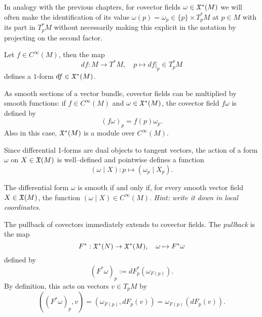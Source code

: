 In analogy with the previous chapters, for covector fields $\omega\in\mathfrak{X}^*(M)$ we will often make the identification of its value $\omega(p) = \omega_p \in \{p\}\times T^*_p M$ at $p\in M$ with its part in $T_p^*M$ without necessarily making this explicit in the notation by projecting on the second factor.

\begin{example}
  Let $f\in C^\infty(M)$, then the map
  \begin{equation}
    df : M \to T^*M, \quad p \mapsto df|_p \in T^*_p M
  \end{equation}
  defines a $1$-form $df\in\mathfrak{X}^*(M)$.
\end{example}

As smooth sections of a vector bundle, covector fields can be multiplied by smooth functions: if $f\in C^\infty(M)$ and $\omega\in\mathfrak{X}^*(M)$, the covector field $f\omega$ is defined by
\begin{equation}
  (f\omega)_p = f(p)\omega_p.
\end{equation}
Also in this case, $\mathfrak{X}^*(M)$ is a module over $C^\infty(M)$.

Since differential 1-forms are dual objects to tangent vectors, the action of a form $\omega$ on $X\in\mathfrak{X}(M)$ is well--defined and pointwise defines a function
\begin{equation}
  (\omega \mid X) : p \mapsto (\omega_p \mid X_p).
\end{equation}

\begin{exercise}
  The differential form $\omega$ is smooth if and only if, for every smooth vector field $X\in\mathfrak{X}(M)$, the function $(\omega \mid X)\in C^\infty(M)$.
  \textit{\small Hint: write it down in local coordinates.}
\end{exercise}

\begin{definition}\label{def:pullback1f}
  The pullback of covectors immediately extends to covector fields.
  The \emph{pullback} is the map
  \begin{equation}
    F^*: \mathfrak{X}^*(N) \to \mathfrak{X}^*(M), \quad \omega \mapsto F^* \omega
  \end{equation}
  defined by
  \begin{equation}
    (F^*\omega)_p := dF_p^*(\omega_{F(p)}).
  \end{equation}
  By definition, this acts on vectors $v\in T_p M$ by
  \begin{equation}
    ((F^*\omega)_p, v) = (\omega_{F(p)}, dF_p(v)) = \omega_{F(p)}(dF_p(v)).
  \end{equation}
\end{definition}

